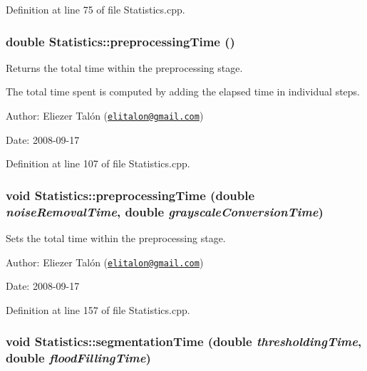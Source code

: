 Definition at line 75 of file Statistics.cpp.\hypertarget{class_statistics_8d7ab1f44a9fb5fe74f2713dbf5e62cd}{
\subsubsection[preprocessingTime]{\setlength{\rightskip}{0pt plus 5cm}double Statistics::preprocessingTime ()}}
\label{class_statistics_8d7ab1f44a9fb5fe74f2713dbf5e62cd}


Returns the total time within the preprocessing stage. 

The total time spent is computed by adding the elapsed time in individual steps.

\begin{Desc}
\item[Author:]Eliezer Talón (\href{mailto:elitalon@gmail.com}{\tt elitalon@gmail.com}) \end{Desc}
\begin{Desc}
\item[Date:]2008-09-17 \end{Desc}


Definition at line 107 of file Statistics.cpp.\hypertarget{class_statistics_ada0f8014981618cc90e1e0020cd7a50}{
\subsubsection[preprocessingTime]{\setlength{\rightskip}{0pt plus 5cm}void Statistics::preprocessingTime (double {\em noiseRemovalTime}, \/  double {\em grayscaleConversionTime})}}
\label{class_statistics_ada0f8014981618cc90e1e0020cd7a50}


Sets the total time within the preprocessing stage. 

\begin{Desc}
\item[Author:]Eliezer Talón (\href{mailto:elitalon@gmail.com}{\tt elitalon@gmail.com}) \end{Desc}
\begin{Desc}
\item[Date:]2008-09-17 \end{Desc}


Definition at line 157 of file Statistics.cpp.\hypertarget{class_statistics_cb7b96b88345347bc41b586f283905fd}{
\subsubsection[segmentationTime]{\setlength{\rightskip}{0pt plus 5cm}void Statistics::segmentationTime (double {\em thresholdingTime}, \/  double {\em floodFillingTime})}}
\label{class_statistics_cb7b96b88345347bc41b586f283905fd}


